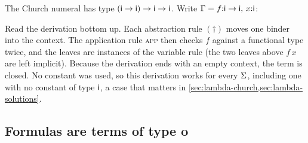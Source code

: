 \begin{example}\label{ex:lambda-typing}
The Church numeral  has type $(\mathsf{i}\to\mathsf{i})\to\mathsf{i}\to\mathsf{i}$. Write
$\Gamma=f{:}\mathsf{i}\to\mathsf{i},\,x{:}\mathsf{i}$:
\begin{mathpar}
\end{mathpar}
Read the derivation bottom up. Each abstraction rule $(\dagger)$ moves one binder into the context.
The application rule \textsc{app} then checks $f$ against a functional type twice, and the leaves are
instances of the variable rule (the two leaves above $f\,x$ are left implicit). Because the derivation
ends with an empty context, the term is closed. No constant was used, so this derivation works for
every $\Sigma$, including one with no constant of type $\mathsf{i}$, a case that matters in
\cref{sec:lambda-church,sec:lambda-solutions}.
\end{example}

\subsection{Formulas are terms of type o}\label{sec:lambda-formulas}

